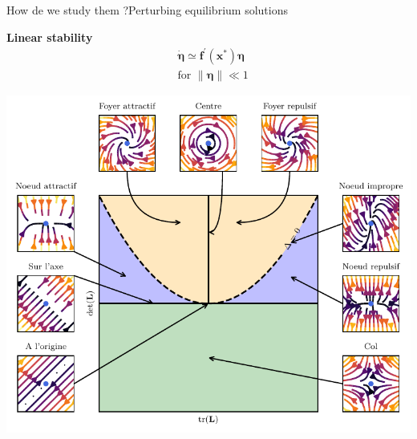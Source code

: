 \documentclass[usenames,dvipsnames,svgnames,10pt,aspectratio=169]{beamer}
\begin{document}
\begin{frame}[t, c]{How de we study them ?}{Perturbing equilibrium solutions}
  \begin{minipage}{.48\textwidth}
    \centering
    \textbf{Linear stability}
    \[
    \begin{aligned}
      & \dot{\boldsymbol{\eta}} \simeq \bm{f}^{\prime}(\bm{x}^*) \boldsymbol{\eta} \\
      & \text{for } \| \boldsymbol{\eta} \| \ll 1
    \end{aligned}
    \]
  \end{minipage}%
  \hfill
  \begin{minipage}{.48\textwidth}
    \centering
    \includegraphics[width=\textwidth]{fixed_points_classification}
  \end{minipage}

  \vspace{1cm}
\end{frame}
\end{document}
